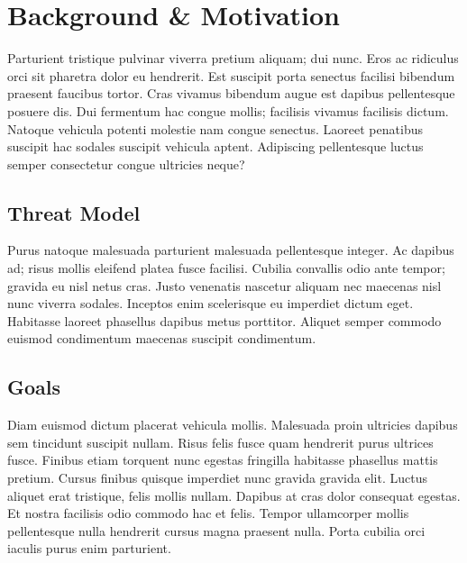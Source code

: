 \section{Background \& Motivation}
\label{sec:background}

Parturient tristique pulvinar viverra pretium aliquam; dui nunc. Eros ac
ridiculus orci sit pharetra dolor eu hendrerit. Est suscipit porta senectus
facilisi bibendum praesent faucibus tortor. Cras vivamus bibendum augue est
dapibus pellentesque posuere dis. Dui fermentum hac congue mollis; facilisis
vivamus facilisis dictum. Natoque vehicula potenti molestie nam congue
senectus. Laoreet penatibus suscipit hac sodales suscipit vehicula aptent.
Adipiscing pellentesque luctus semper consectetur congue ultricies neque?


\subsection{Threat Model}
\label{sec:threat-model}

Purus natoque malesuada parturient malesuada pellentesque integer. Ac dapibus
ad; risus mollis eleifend platea fusce facilisi. Cubilia convallis odio ante
tempor; gravida eu nisl netus cras. Justo venenatis nascetur aliquam nec
maecenas nisl nunc viverra sodales. Inceptos enim scelerisque eu imperdiet
dictum eget. Habitasse laoreet phasellus dapibus metus porttitor. Aliquet
semper commodo euismod condimentum maecenas suscipit condimentum.


\subsection{Goals}
\label{sec:goals}

Diam euismod dictum placerat vehicula mollis. Malesuada proin ultricies dapibus
sem tincidunt suscipit nullam. Risus felis fusce quam hendrerit purus ultrices
fusce. Finibus etiam torquent nunc egestas fringilla habitasse phasellus mattis
pretium. Cursus finibus quisque imperdiet nunc gravida gravida elit. Luctus
aliquet erat tristique, felis mollis nullam. Dapibus at cras dolor consequat
egestas. Et nostra facilisis odio commodo hac et felis. Tempor ullamcorper
mollis pellentesque nulla hendrerit cursus magna praesent nulla. Porta cubilia
orci iaculis purus enim parturient.
